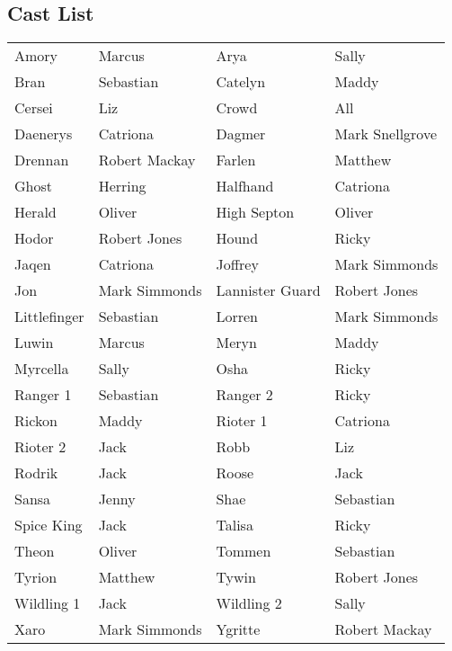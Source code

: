 \subsection*{Cast List}
\begin{tabular}{ll|ll}\\
Amory & Marcus &  Arya & Sally\\
Bran & Sebastian &  Catelyn & Maddy\\
Cersei & Liz &  Crowd & All\\
Daenerys & Catriona &  Dagmer & Mark Snellgrove\\
Drennan & Robert Mackay &  Farlen & Matthew\\
Ghost & Herring &  Halfhand & Catriona\\
Herald & Oliver &  High Septon & Oliver\\
Hodor & Robert Jones &  Hound & Ricky\\
Jaqen & Catriona &  Joffrey & Mark Simmonds\\
Jon & Mark Simmonds &  Lannister Guard & Robert Jones\\
Littlefinger & Sebastian &  Lorren & Mark Simmonds\\
Luwin & Marcus &  Meryn & Maddy\\
Myrcella & Sally &  Osha & Ricky\\
Ranger 1 & Sebastian &  Ranger 2 & Ricky\\
Rickon & Maddy &  Rioter 1 & Catriona\\
Rioter 2 & Jack &  Robb & Liz\\
Rodrik & Jack &  Roose & Jack\\
Sansa & Jenny &  Shae & Sebastian\\
Spice King & Jack &  Talisa & Ricky\\
Theon & Oliver &  Tommen & Sebastian\\
Tyrion & Matthew &  Tywin & Robert Jones\\
Wildling 1 & Jack &  Wildling 2 & Sally\\
Xaro & Mark Simmonds &  Ygritte & Robert Mackay\\
\end{tabular}
